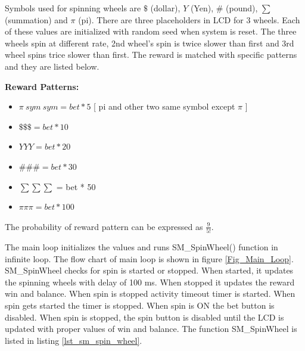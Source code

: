 \documentclass[a4paper,13pt,openany,sffamily]{memoir}
\begin{document}
\newpage
Symbols used for spinning wheels are \(\$\) (dollar), \(Y\) (Yen), \(\#\) (pound), \(\sum\) (summation) and \(\pi\) (pi). There are three placeholders in LCD for 3 wheels. Each of these values are initialized with random seed when system is reset. The three wheels spin at different rate, 2nd wheel's spin is twice slower than first and 3rd wheel spins trice slower than first. The reward is matched with specific patterns and they are listed below. 

\large \textbf {Reward Patterns:}

\begin{itemize}
\item \normalsize \( \pi\ sym\ sym = bet * 5 \)  [ pi and other two same symbol except \(\pi\) ] 
\item \( \$ \$ \$ = bet * 10 \)  
\item \( Y Y Y = bet * 20  \)
\item \( \# \# \# = bet * 30 \) 
\item \tiny \( \sum \sum \sum\) \normalsize = bet * 50
\item \normalsize \( \pi \pi \pi = bet * 100 \)   
\end{itemize}
 
The probability of reward pattern can be expressed as \( \frac{9}{5!} \).

\newpage
The main loop initializes the values and runs SM\_SpinWheel() function in infinite loop. The flow chart of main loop is shown in figure \ref{Fig_Main_Loop}. SM\_SpinWheel checks for spin is started or stopped. When started, it updates the spinning wheels with delay of 100 ms. When stopped it updates the reward win and balance. When spin is stopped activity timeout timer is started. When spin gets started the timer is stopped. When spin is ON the bet button is disabled. When spin is stopped, the spin button is disabled until the LCD is updated with proper values of win and balance. The function SM\_SpinWheel is listed in listing \ref{lst_sm_spin_wheel}. 
\end{document}
